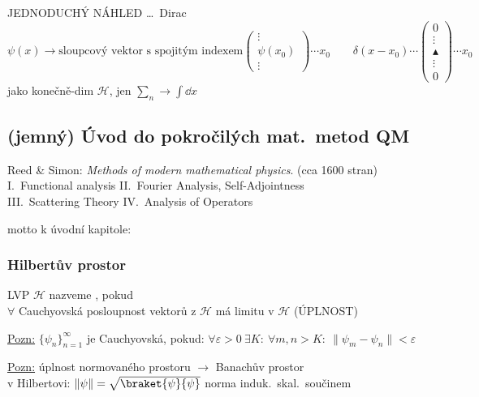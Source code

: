 \documentclass[11pt,a4paper]{article}
\begin{document}
JEDNODUCHÝ NÁHLED \dots\ Dirac
\[
  \psi(x) \to \text{sloupcový vektor s spojitým indexem}
  \begin{pmatrix}\vdots\\ \psi(x_0)\\ \vdots\end{pmatrix}\!\cdots x_0
  \qquad
  \delta(x - x_0)\cdots
  \begin{pmatrix}0\\ \vdots\\ \blacktriangle\\ \vdots\\ 0\end{pmatrix}\!\cdots x_0
\]
\hfill jako konečně-dim $\mathcal{H}$, jen $\sum_n\to\int\dd x$

\subsection{(jemný) Úvod do pokročilých mat.\ metod QM}

Reed \& Simon: \emph{Methods of modern mathematical physics}. \quad (cca 1600 stran) \\
\quad I.\ Functional analysis \quad II.\ Fourier Analysis, Self-Adjointness \\
\quad III.\ Scattering Theory \quad IV.\ Analysis of Operators

motto k úvodní kapitole: \emph{}

\subsubsection*{Hilbertův prostor }
\begin{definice}
LVP $\mathcal{H}$ nazveme , pokud \\
\quad $\forall$ Cauchyovská posloupnost vektorů z $\mathcal{H}$ má limitu v $\mathcal{H}$ \hfill (ÚPLNOST)
\end{definice}

\underline{Pozn:} $\{\psi_n\}_{n=1}^\infty$ je Cauchyovská, pokud:
\quad $\forall\varepsilon > 0\ \exists K:\ \forall m,n > K:\ \|\psi_m - \psi_n\| < \varepsilon$

\underline{Pozn:} úplnost normovaného prostoru $\to$ Banachův prostor \\
\quad v Hilbertovi: \quad $\|\psi\| = \sqrt{\braket{\psi}{\psi}}$ \quad norma induk.\ skal.\ součinem
\end{document}
